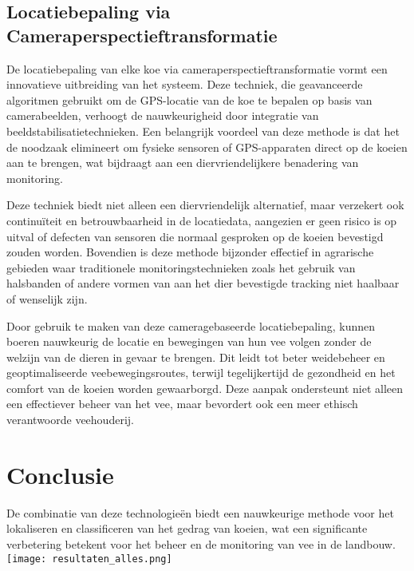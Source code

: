 \subsection{Locatiebepaling via Cameraperspectieftransformatie}
De locatiebepaling van elke koe via cameraperspectieftransformatie vormt een innovatieve uitbreiding van het systeem. Deze techniek, die geavanceerde algoritmen gebruikt om de GPS-locatie van de koe te bepalen op basis van camerabeelden, verhoogt de nauwkeurigheid door integratie van beeldstabilisatietechnieken. Een belangrijk voordeel van deze methode is dat het de noodzaak elimineert om fysieke sensoren of GPS-apparaten direct op de koeien aan te brengen, wat bijdraagt aan een diervriendelijkere benadering van monitoring.

Deze techniek biedt niet alleen een diervriendelijk alternatief, maar verzekert ook continuïteit en betrouwbaarheid in de locatiedata, aangezien er geen risico is op uitval of defecten van sensoren die normaal gesproken op de koeien bevestigd zouden worden. Bovendien is deze methode bijzonder effectief in agrarische gebieden waar traditionele monitoringstechnieken zoals het gebruik van halsbanden of andere vormen van aan het dier bevestigde tracking niet haalbaar of wenselijk zijn.

Door gebruik te maken van deze cameragebaseerde locatiebepaling, kunnen boeren nauwkeurig de locatie en bewegingen van hun vee volgen zonder de welzijn van de dieren in gevaar te brengen. Dit leidt tot beter weidebeheer en geoptimaliseerde veebewegingsroutes, terwijl tegelijkertijd de gezondheid en het comfort van de koeien worden gewaarborgd. Deze aanpak ondersteunt niet alleen een effectiever beheer van het vee, maar bevordert ook een meer ethisch verantwoorde veehouderij.
\section{Conclusie}
De combinatie van deze technologieën biedt een nauwkeurige methode voor het lokaliseren en classificeren van het gedrag van koeien, wat een significante verbetering betekent voor het beheer en de monitoring van vee in de landbouw.
\newline
\texttt{[image: resultaten\_alles.png]}
\newline